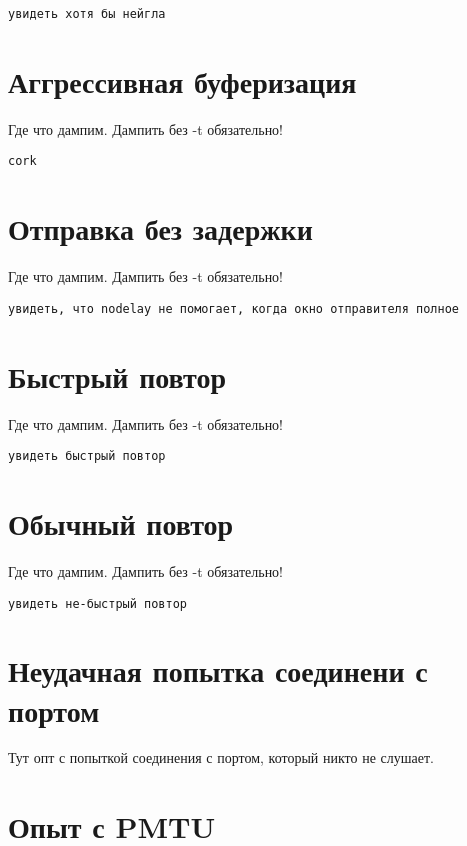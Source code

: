 \documentclass[a4paper,12pt]{article}
\begin{document}
\begin{Verbatim}
увидеть хотя бы нейгла
\end{Verbatim}

\section{Аггрессивная буферизация}

Где что дампим.  Дампить без -t обязательно!

\begin{Verbatim}
cork
\end{Verbatim}

\section{Отправка без задержки}

Где что дампим.  Дампить без -t обязательно!

\begin{Verbatim}
увидеть, что nodelay не помогает, когда окно отправителя полное
\end{Verbatim}

\section{Быстрый повтор}

Где что дампим.  Дампить без -t обязательно!

\begin{Verbatim}
увидеть быстрый повтор
\end{Verbatim}

\section{Обычный повтор}

Где что дампим. Дампить без -t обязательно!

\begin{Verbatim}
увидеть не-быстрый повтор
\end{Verbatim}

\section{Неудачная попытка соединени с портом}

Тут опт с попыткой соединения с портом, который никто не слушает.

\section{Опыт с PMTU}
\end{document}
